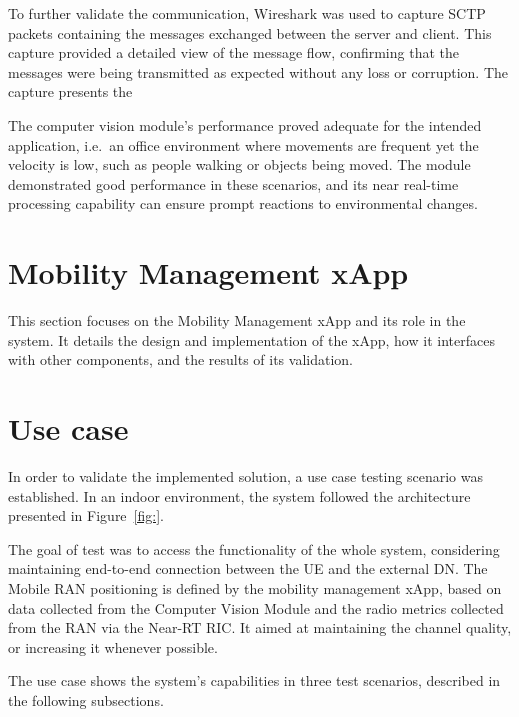To further validate the communication, Wireshark was used to capture SCTP packets containing the messages exchanged between the server and client.
This capture provided a detailed view of the message flow, confirming that the messages were being transmitted as expected without any loss or corruption.
The capture presents the





The computer vision module's performance proved adequate for the intended application, i.e.\ an office environment where movements are frequent yet the velocity is low, such as people walking or objects being moved.
The module demonstrated good performance in these scenarios, and its near real-time processing capability can ensure prompt reactions to environmental changes.



\section{Mobility Management xApp}\label{sec:mm_xapp}
This section focuses on the Mobility Management xApp and its role in the system.
It details the design and implementation of the xApp, how it interfaces with other components, and the results of its validation.

\section{Use case}\label{sec:use_case}
In order to validate the implemented solution, a use case testing scenario was established.
In an indoor environment, the system followed the architecture presented in Figure~\ref{fig:}.



The goal of test was to access the functionality of the whole system, considering maintaining end-to-end connection between the UE and the external DN. The Mobile RAN positioning is defined by the mobility management xApp, based on data collected from the Computer Vision Module and the radio metrics collected from the RAN via the Near-RT RIC. It aimed at maintaining the channel quality, or increasing it whenever possible.

The use case shows the system's capabilities in three test scenarios, described in the following subsections.

